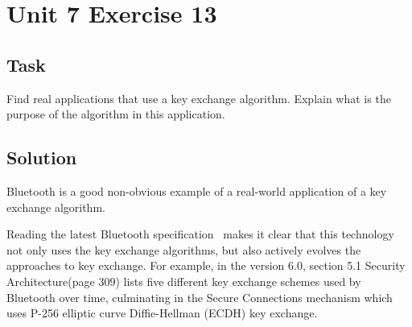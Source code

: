 \section{Unit 7 Exercise 13}

\subsection{Task}
Find real applications that use a key exchange algorithm. Explain
what is the purpose of the algorithm in this application.

\subsection{Solution}

Bluetooth is a good non-obvious example of a real-world application of a key exchange algorithm.

Reading the latest Bluetooth specification~\cite{bluetooth} makes it clear that this technology not only uses the key exchange algorithms, but also actively evolves the approaches to key exchange.
For example, in the version 6.0, section 5.1 Security Architecture(page 309) lists five different key exchange schemes used by Bluetooth over time, culminating in the Secure Connections mechanism which uses P-256 elliptic curve Diffie-Hellman (ECDH) key exchange.